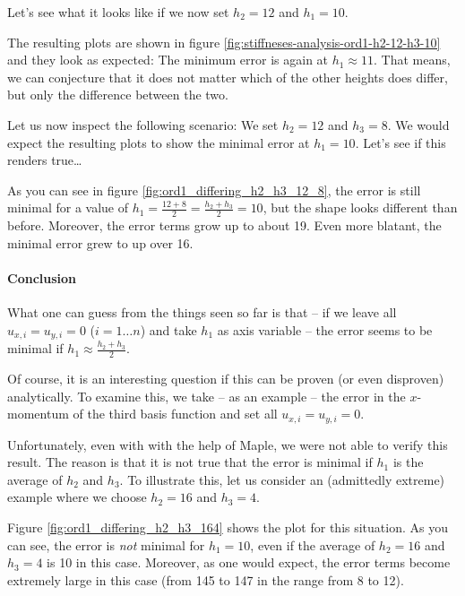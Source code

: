 \documentclass{article}
\begin{document}
Let's see what it looks like if we now set $h_2=12$ and $h_1=10$.



The resulting plots are shown in figure \ref{fig:stiffneses-analysis-ord1-h2-12-h3-10} and they look as expected: The minimum error is again at $h_1\approx 11$. That means, we can conjecture that it does not matter which of the other heights does differ, but only the difference between the two.

Let us now inspect the following scenario: We set $h_2=12$ and $h_3=8$. We would expect the resulting plots to show the minimal error at $h_1=10$. Let's see if this renders true\dots



As you can see in figure \ref{fig:ord1_differing_h2_h3_12_8}, the error is still minimal for a value of $h_1=\frac{12+8}{2}=\frac{h_2+h_3}{2}=10$, but the shape looks different than before. Moreover, the error terms grow up to about 19. Even more blatant, the minimal error grew to up over 16.

\paragraph{Conclusion}

What one can guess from the things seen so far is that -- if we leave all $u_{x,i}=u_{y,i}=0$ ($i=1\dots n$) and take $h_1$ as axis variable -- the error seems to be minimal if $h_1\approx \frac{h_2+h_3}{2}$.

Of course, it is an interesting question if this can be proven (or even disproven) analytically. To examine this, we take -- as an example -- the error in the $x$-momentum of the third basis function and set all $u_{x,i}=u_{y,i}=0$. 

Unfortunately, even with with the help of Maple, we were not able to verify this result. The reason is that it is not true that the error is minimal if $h_1$ is the average of $h_2$ and $h_3$. To illustrate this, let us consider an (admittedly extreme) example where we choose $h_2=16$ and $h_3=4$.



Figure \ref{fig:ord1_differing_h2_h3_164} shows the plot for this situation. As you can see, the error is \emph{not} minimal for $h_1=10$, even if the average of $h_2=16$ and $h_3=4$ is 10 in this case. Moreover, as one would expect, the error terms become extremely large in this case (from 145 to 147 in the range from 8 to 12).
\end{document}
